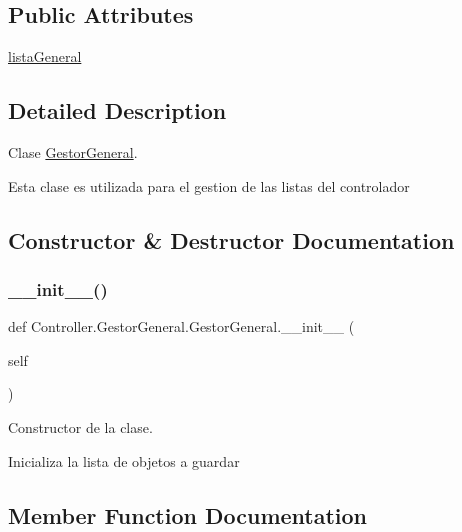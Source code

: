 \subsection*{Public Attributes}
\begin{DoxyCompactItemize}
\item 
\hyperlink{class_controller_1_1_gestor_general_1_1_gestor_general_ab452eb1d569c4a9dba41ae21c833c296}{lista\+General}
\end{DoxyCompactItemize}


\subsection{Detailed Description}
Clase \hyperlink{class_controller_1_1_gestor_general_1_1_gestor_general}{Gestor\+General}. 

Esta clase es utilizada para el gestion de las listas del controlador 

\subsection{Constructor \& Destructor Documentation}
\mbox{\label{class_controller_1_1_gestor_general_1_1_gestor_general_ae863157e839c4210ed21da4d237e69ca}} 
\subsubsection{\texorpdfstring{\+\_\+\+\_\+init\+\_\+\+\_\+()}{\_\_init\_\_()}}
{\footnotesize\ttfamily def Controller.\+Gestor\+General.\+Gestor\+General.\+\_\+\+\_\+init\+\_\+\+\_\+ (\begin{DoxyParamCaption}\item[{}]{self }\end{DoxyParamCaption})}



Constructor de la clase. 

Inicializa la lista de objetos a guardar 

\subsection{Member Function Documentation}
\mbox{\label{class_controller_1_1_gestor_general_1_1_gestor_general_a9b620b3b9747d3f976c499d623bb975b}} 
